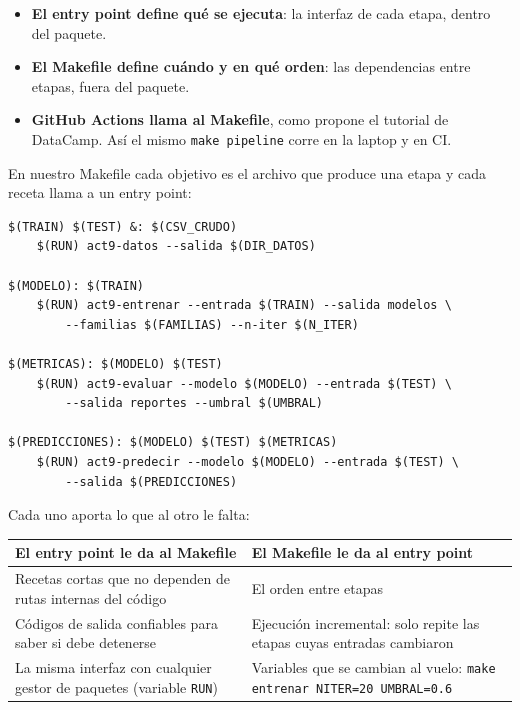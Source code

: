\documentclass[12pt,a4paper]{article}
\renewcommand{\_}{\guionbajo\allowbreak}
\begin{document}
\begin{itemize}[leftmargin=1.4em]
\item \textbf{El entry point define qué se ejecuta}: la interfaz de cada etapa, dentro del paquete.
\item \textbf{El Makefile define cuándo y en qué orden}: las dependencias entre etapas, fuera del
paquete.
\item \textbf{GitHub Actions llama al Makefile}, como propone el tutorial de DataCamp. Así el mismo
\texttt{make pipeline} corre en la laptop y en CI.
\end{itemize}

En nuestro Makefile cada objetivo es el archivo que produce una etapa y cada receta llama a un
entry point:

\begin{verbatim}
$(TRAIN) $(TEST) &: $(CSV_CRUDO)
	$(RUN) act9-datos --salida $(DIR_DATOS)

$(MODELO): $(TRAIN)
	$(RUN) act9-entrenar --entrada $(TRAIN) --salida modelos \
	    --familias $(FAMILIAS) --n-iter $(N_ITER)

$(METRICAS): $(MODELO) $(TEST)
	$(RUN) act9-evaluar --modelo $(MODELO) --entrada $(TEST) \
	    --salida reportes --umbral $(UMBRAL)

$(PREDICCIONES): $(MODELO) $(TEST) $(METRICAS)
	$(RUN) act9-predecir --modelo $(MODELO) --entrada $(TEST) \
	    --salida $(PREDICCIONES)
\end{verbatim}

Cada uno aporta lo que al otro le falta:

\begin{center}
\renewcommand{\arraystretch}{1.4}
\begin{tabular}{|>{\raggedright\arraybackslash}p{6.6cm}|>{\raggedright\arraybackslash}p{7cm}|}
\hline
\textbf{El entry point le da al Makefile} & \textbf{El Makefile le da al entry point} \\
\hline
Recetas cortas que no dependen de rutas internas del código & El orden entre etapas \\
\hline
Códigos de salida confiables para saber si debe detenerse & Ejecución incremental: solo repite
las etapas cuyas entradas cambiaron \\
\hline
La misma interfaz con cualquier gestor de paquetes (variable \texttt{RUN}) & Variables que se
cambian al vuelo: \texttt{make entrenar N\_ITER=20 UMBRAL=0.6} \\
\hline
\end{tabular}
\end{center}
\end{document}
